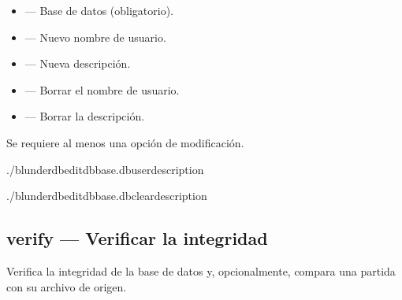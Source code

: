 \documentclass[letterpaper,10pt,spanish]{sphinxmanual}
\begin{document}
\sphinxAtStartPar
{}
\begin{itemize}
\item {} 
\sphinxAtStartPar
{} — Base de datos (obligatorio).

\item {} 
\sphinxAtStartPar
{} — Nuevo nombre de usuario.

\item {} 
\sphinxAtStartPar
{} — Nueva descripción.

\item {} 
\sphinxAtStartPar
{} — Borrar el nombre de usuario.

\item {} 
\sphinxAtStartPar
{} — Borrar la descripción.

\end{itemize}

\sphinxAtStartPar
Se requiere al menos una opción de modificación.

\sphinxAtStartPar
{}

\begin{sphinxVerbatim}[commandchars=\\\{\}]
./blunderdbedit\PYGZhy{}\PYGZhy{}dbbase.db\PYGZhy{}\PYGZhy{}user\PYGZhy{}\PYGZhy{}description

./blunderdbedit\PYGZhy{}\PYGZhy{}dbbase.db\PYGZhy{}\PYGZhy{}clear\PYGZhy{}description
\end{sphinxVerbatim}


\subsection{verify — Verificar la integridad}
\label{\detokenize{cli:verify-verifier-l-integrite}}
\sphinxAtStartPar
Verifica la integridad de la base de datos y, opcionalmente, compara una partida con su archivo de origen.
\end{document}
